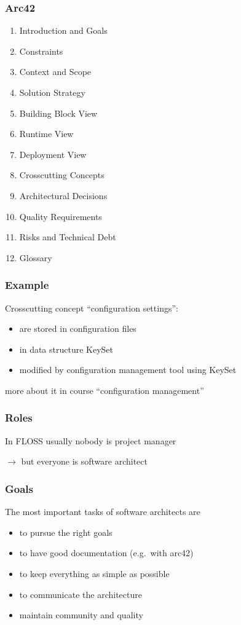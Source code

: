 \begin{frame}
	\frametitle{Arc42}
	\begin{enumerate}[<+-| alert@+>]
	\item Introduction and Goals
	\item Constraints
	\item Context and Scope
	\item Solution Strategy
	\item Building Block View
	\item Runtime View
	\item Deployment View
	\item Crosscutting Concepts
	\item Architectural Decisions~\cite{zdun2007patterns}
	\item Quality Requirements
	\item Risks and Technical Debt
	\item Glossary
	\end{enumerate}
\end{frame}

\begin{frame}
	\frametitle{Example}

	Crosscutting concept ``configuration settings'':

	\begin{itemize}
	\item are stored in configuration files
	\item in data structure KeySet
	\item modified by configuration management tool using KeySet
	\end{itemize}

	more about it in course ``configuration management''
\end{frame}

\begin{frame}
	\frametitle{Roles}

	In FLOSS usually nobody is project manager

	\pause

	$\rightarrow$ but everyone is software architect
\end{frame}

\begin{frame}
	\frametitle{Goals}

	The most important tasks of software architects are

	\begin{itemize}[<+-| alert@+>]
	\item to pursue the right goals
	\item to have good documentation (e.g.\ with arc42)
	\item to keep everything as simple as possible
	\item to communicate the architecture
	\item maintain community and quality
	\end{itemize}
\end{frame}

